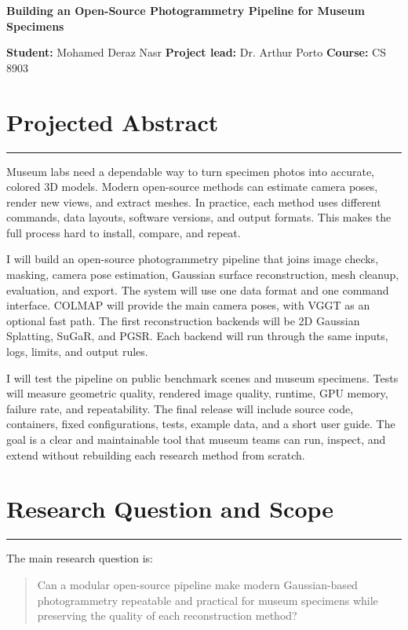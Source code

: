 \documentclass[10pt]{article}
\newcommand{\sectionrule}{\vspace{-4pt}\color{rulegray}\hrule\color{black}\vspace{5pt}}
\begin{document}
\begin{center}
    {\LARGE\bfseries Building an Open-Source Photogrammetry Pipeline for Museum Specimens}\par
    \vspace{8pt}
    \textbf{Student:} Mohamed Deraz Nasr \quad
    \textbf{Project lead:} Dr. Arthur Porto \quad
    \textbf{Course:} CS 8903
\end{center}

\section*{Projected Abstract}
\sectionrule

Museum labs need a dependable way to turn specimen photos into accurate, colored 3D models. Modern open-source methods can estimate camera poses, render new views, and extract meshes. In practice, each method uses different commands, data layouts, software versions, and output formats. This makes the full process hard to install, compare, and repeat.

I will build an open-source photogrammetry pipeline that joins image checks, masking, camera pose estimation, Gaussian surface reconstruction, mesh cleanup, evaluation, and export. The system will use one data format and one command interface. COLMAP will provide the main camera poses, with VGGT as an optional fast path. The first reconstruction backends will be 2D Gaussian Splatting, SuGaR, and PGSR. Each backend will run through the same inputs, logs, limits, and output rules.

I will test the pipeline on public benchmark scenes and museum specimens. Tests will measure geometric quality, rendered image quality, runtime, GPU memory, failure rate, and repeatability. The final release will include source code, containers, fixed configurations, tests, example data, and a short user guide. The goal is a clear and maintainable tool that museum teams can run, inspect, and extend without rebuilding each research method from scratch.

\section*{Research Question and Scope}
\sectionrule

The main research question is:

\begin{quote}
Can a modular open-source pipeline make modern Gaussian-based photogrammetry repeatable and practical for museum specimens while preserving the quality of each reconstruction method?
\end{quote}
\end{document}
